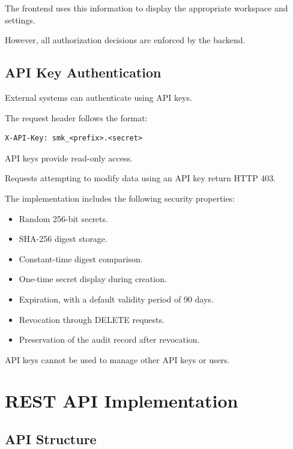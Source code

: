 \documentclass[11pt,a4paper]{article}
\begin{document}
The frontend uses this information to display
the appropriate workspace and settings.

However, all authorization decisions are
enforced by the backend.

\subsection{API Key Authentication}

External systems can authenticate using
API keys.

The request header follows the format:

\begin{lstlisting}
X-API-Key: smk_<prefix>.<secret>
\end{lstlisting}

API keys provide read-only access.

Requests attempting to modify data using
an API key return HTTP 403.

The implementation includes the following
security properties:

\begin{itemize}
    \item Random 256-bit secrets.
    \item SHA-256 digest storage.
    \item Constant-time digest comparison.
    \item One-time secret display during creation.
    \item Expiration, with a default validity
    period of 90 days.
    \item Revocation through DELETE requests.
    \item Preservation of the audit record
    after revocation.
\end{itemize}

API keys cannot be used to manage
other API keys or users.


\section{REST API Implementation}

\subsection{API Structure}
\end{document}

